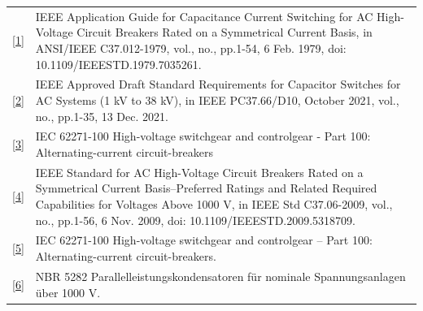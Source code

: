 \documentclass[a4paper]{article}
\begin{document}
\noindent
\begin{tabular}{p{0.2cm} p{15.8cm}}
    \href{https://ieeexplore.ieee.org/document/7035261}{[1]} &
    \begin{minipage}[t]{15.8cm}
        IEEE Application Guide for Capacitance Current Switching for AC High-Voltage Circuit Breakers Rated on a Symmetrical Current Basis, in ANSI/IEEE C37.012-1979, vol., no., pp.1-54, 6 Feb. 1979, doi: 10.1109/IEEESTD.1979.7035261.
    \end{minipage} \\

    \href{https://ieeexplore.ieee.org/document/9574631}{[2]} &
    \begin{minipage}[t]{15.8cm}
        IEEE Approved Draft Standard Requirements for Capacitor Switches for AC Systems (1 kV to 38 kV), in IEEE PC37.66/D10, October 2021, vol., no., pp.1-35, 13 Dec. 2021.
    \end{minipage} \\


    \href{https://webstore.iec.ch/publication/62785}{[3]} &
    \begin{minipage}[t]{15.8cm}
       IEC 62271-100 High-voltage switchgear and controlgear - Part 100: Alternating-current circuit-breakers
    \end{minipage} \\

    \href{https://ieeexplore.ieee.org/document/5318709}{[4]} &
    \begin{minipage}[t]{15.8cm}
        IEEE Standard for AC High-Voltage Circuit Breakers Rated on a Symmetrical Current Basis--Preferred Ratings and Related Required Capabilities for Voltages Above 1000 V, in IEEE Std C37.06-2009, vol., no., pp.1-56, 6 Nov. 2009, doi: 10.1109/IEEESTD.2009.5318709.
    \end{minipage} \\

    \href{https://cdn.standards.iteh.ai/samples/101972/4e7e06bd66d2443da668b8e0c6c60512/IEC-62271-100-2021.pdf}{[5]} &
    \begin{minipage}[t]{15.8cm}
        IEC 62271-100 High-voltage switchgear and controlgear – Part 100: Alternating-current circuit-breakers.
    \end{minipage} \\

    \href{https://www.normas.com.br/autorizar/visualizacao-nbr/313/identificar/visitante}{[6]} &
    \begin{minipage}[t]{15.8cm}
        NBR 5282 Parallelleistungskondensatoren für nominale Spannungsanlagen über 1000 V.
    \end{minipage} \\
\end{tabular}
\end{document}
